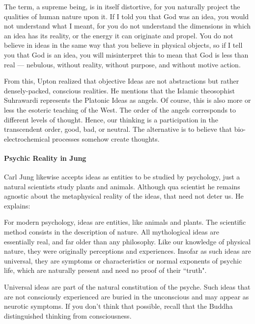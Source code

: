 \begin{quotex}
The term, a supreme being, is in itself distortive, for you naturally project the qualities of human nature upon it. If I told you that God was an idea, you would not understand what I meant, for you do not understand the dimensions in which an idea has its reality, or the energy it can originate and propel. You do not believe in ideas in the same way that you believe in physical objects, so if I tell you that God is an idea, you will misinterpret this to mean that God is less than real — nebulous, without reality, without purpose, and without motive action. 

\end{quotex}
From this, Upton realized that objective Ideas are not abstractions but rather densely-packed, conscious realities. He mentions that the Islamic theosophist Suhrawardi represents the Platonic Ideas as angels. Of course, this is also more or less the esoteric teaching of the West. The order of the angels corresponds to different levels of thought. Hence, our thinking is a participation in the transcendent order, good, bad, or neutral. The alternative is to believe that bio-electrochemical processes somehow create thoughts.

\paragraph{Psychic Reality in Jung}
Carl Jung likewise accepts ideas as entities to be studied by psychology, just a natural scientists study plants and animals. Although qua scientist he remains agnostic about the metaphysical reality of the ideas, that need not deter us. He explains:

\begin{quotex}
For modern psychology, ideas are entities, like animals and plants. The scientific method consists in the description of nature. All mythological ideas are essentially real, and far older than any philosophy. Like our knowledge of physical nature, they were originally perceptions and experiences. Insofar as such ideas are universal, they are symptoms or characteristics or normal exponents of psychic life, which are naturally present and need no proof of their ``truth". 

\end{quotex}
Universal ideas are part of the natural constitution of the psyche. Such ideas that are not consciously experienced are buried in the unconscious and may appear as neurotic symptoms. If you don't think that possible, recall that the Buddha distinguished thinking from consciousness.


